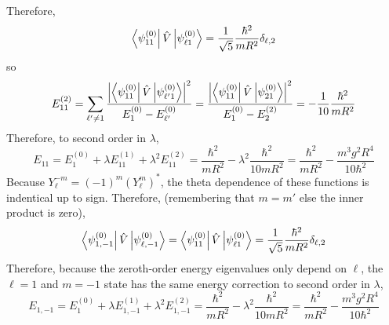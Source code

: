 \documentclass[12pt]{extarticle}
\begin{document}
Therefore,
\[\left< \psi^{(0)}_{11} \right| \hat{V} \left| \psi^{(0)}_{\ell 1} \right> = \frac{1}{\sqrt{5}} \frac{\hbar^2}{ mR^2} \delta_{\ell,2} \] 
so
\[ E^{(2)}_{11} = \sum_{\ell' \neq 1} \frac{\left|\left< \psi^{(0)}_{11} \right| \hat{V} \left| \psi^{(0)}_{\ell'1} \right> \right|^2}{E^{(0)}_{1} - E^{(0)}_{\ell'}} = \frac{\left|\left< \psi^{(0)}_{11} \right| \hat{V} \left| \psi^{(0)}_{21} \right> \right|^2}{E^{(0)}_{1} - E^{(2)}_2} = - \frac{1}{10} \frac{\hbar^2}{mR^2} \]
Therefore, to second order in $\lambda$,
\[E_{11} = E^{(0)}_1 + \lambda E^{(1)}_{11} + \lambda^2 E^{(2)}_{11} = \frac{\hbar^2}{m R^2} - \lambda^2 \frac{\hbar^2}{10 m R^2} = \frac{\hbar^2}{m R^2} - \frac{m^3 g^2 R^4}{10 \hbar^2} \] 
Because $Y_{\ell}^{-m} = (-1)^m (Y_{\ell}^{m})^{*}$, the theta dependence of these functions is indentical up to sign. Therefore, (remembering that $m = m'$ else the inner product is zero),
\[ \left< \psi^{(0)}_{1,-1} \right| \hat{V} \left| \psi^{(0)}_{\ell, -1} \right> = \left< \psi^{(0)}_{11} \right| \hat{V} \left| \psi^{(0)}_{\ell 1} \right> = \frac{1}{\sqrt{5}} \frac{\hbar^2}{mR^2} \delta_{\ell,2}\]
Therefore, because the zeroth-order energy eigenvalues only depend on $\ell$, the $\ell = 1$ and $m = -1$ state has the same energy correction to second order in $\lambda$,
\[E_{1,-1} = E^{(0)}_1 + \lambda E^{(1)}_{1,-1} + \lambda^2 E^{(2)}_{1,-1} = \frac{\hbar^2}{m R^2} - \lambda^2 \frac{\hbar^2}{10 mR^2} = \frac{\hbar^2}{m R^2} - \frac{m^3 g^2 R^4}{10 \hbar^2} \] 
\end{document}
